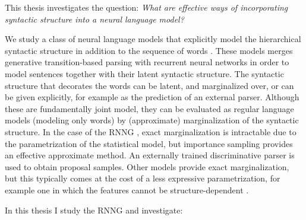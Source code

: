 % 

This thesis investigates the question: \textit{What are effective ways of incorporating syntactic structure into a neural language model?}

We study a class of neural language models that explicitly model the hierarchical syntactic structure in addition to the sequence of words \citep{dyer2016rnng,buys2015generative,buys2018exact}. These models merges generative transition-based parsing with recurrent neural networks in order to model sentences together with their latent syntactic structure. The syntactic structure that decorates the words can be latent, and marginalized over, or can be given explicitly, for example as the prediction of an external parser. Although these are fundamentally joint model, they can be evaluated as regular language models (modeling only words) by (approximate) marginalization of the syntactic structure. In the case of the RNNG \citep{dyer2016rnng}, exact marginalization is intractable due to the parametrization of the statistical model, but importance sampling provides an effective approximate method. An externally trained discriminative parser is used to obtain proposal samples. Other models provide exact marginalization, but this typically comes at the cost of a less expressive parametrization, for example one in which the features cannot be structure-dependent \citep{buys2018exact}.

In this thesis I study the RNNG \citep{dyer2016rnng} and investigate:

